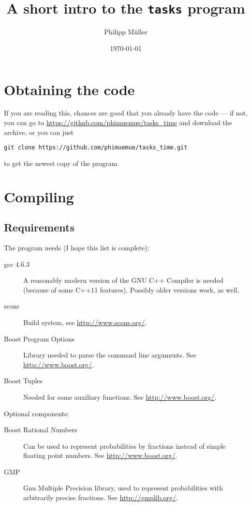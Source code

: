 \documentclass[usletter]{article}
\title{A short intro to the \texttt{tasks} program}
\date{\today}
\author{Philipp Müller}
\begin{document}
\maketitle

\section{Obtaining the code}

If you are reading this, chances are good that you already have the code --- if not, you can go to \url{https://github.com/phimuemue/tasks_time} and download the archive, or you can just
\begin{verbatim}
git clone https://github.com/phimuemue/tasks_time.git
\end{verbatim}
to get the newest copy of the program.

\section{Compiling}

\subsection{Requirements}

The program needs (I hope this list is complete):
\begin{description}
\item[gcc 4.6.3] A reasonably modern version of the GNU C++ Compiler is needed (because of some C++11 features). Possibly older versions work, as well.
\item[scons] Build system, see \url{http://www.scons.org/}.
\item[Boost Program Options] Library needed to parse the command line arguments. See \url{http://www.boost.org/}.
\item[Boost Tuples] Needed for some auxiliary functions. See \url{http://www.boost.org/}.
\end{description}

Optional components:
\begin{description}
\item[Boost Rational Numbers] Can be used to represent probabilities by fractions instead of simple floating point numbers. See \url{http://www.boost.org/}.
\item[GMP] Gnu Multiple Precision library, used to represent probabilities with arbitrarily precise fractions. See \url{http://gmplib.org/}.
\end{description}
\end{document}
